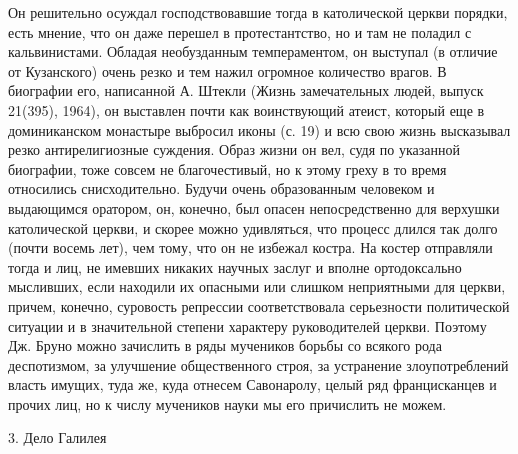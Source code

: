 Он  решительно осуждал  господствовавшие тогда  в католической  церкви
порядки, есть мнение,  что он даже перешел в протестантство,  но и там
не  поладил с  кальвинистами. Обладая  необузданным темпераментом,  он
выступал (в  отличие от Кузанского)  очень резко и тем  нажил огромное
количество  врагов.  В  биографии  его, написанной  А.  Штекли  (Жизнь
замечательных  людей, выпуск  21(395), 1964),  он выставлен  почти как
воинствующий атеист,  который еще  в доминиканском  монастыре выбросил
иконы  (с.  19) и  всю  свою  жизнь высказывал  резко  антирелигиозные
суждения.  Образ  жизни он  вел,  судя  по указанной  биографии,  тоже
совсем  не благочестивый,  но  к  этому греху  в  то время  относились
снисходительно.  Будучи  очень  образованным  человеком  и  выдающимся
оратором,  он,  конечно,  был   опасен  непосредственно  для  верхушки
католической церкви, и скорее можно удивляться, что процесс длился так
долго  (почти восемь  лет), чем  тому, что  он не  избежал костра.  На
костер  отправляли тогда  и  лиц, не  имевших  никаких научных  заслуг
и  вполне  ортодоксально  мысливших,  если находили  их  опасными  или
слишком неприятными  для церкви, причем, конечно,  суровость репрессии
соответствовала  серьезности политической  ситуации  и в  значительной
степени  характеру  руководителей  церкви.  Поэтому  Дж.  Бруно  можно
зачислить  в ряды  мучеников борьбы  со всякого  рода деспотизмом,  за
улучшение  общественного строя,  за устранение  злоупотреблений власть
имущих, туда  же, куда отнесем  Савонаролу, целый ряд  францисканцев и
прочих лиц, но к числу мучеников науки мы его причислить не можем.

3. Дело Галилея

